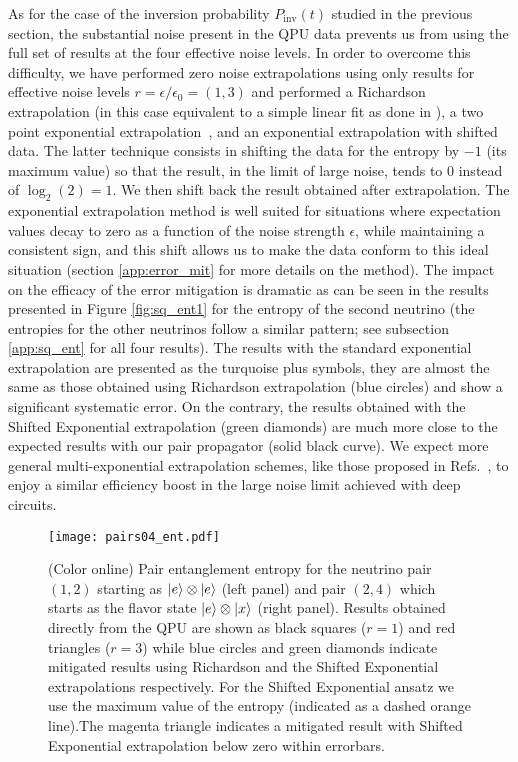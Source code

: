 \documentclass[10pt]{article}
\begin{document}
As for the case of the inversion probability $P_{\text{inv}}(t)$ studied in the previous section, the substantial noise present in the QPU data prevents us from using the full set of results at the four effective noise levels. In order to overcome this difficulty, we have performed zero noise extrapolations using only results for effective noise levels $r=\epsilon/\epsilon_0=(1,3)$ and performed a Richardson extrapolation (in this case equivalent to a simple linear fit as done in \cite{Dumitrescu2018}), a two point exponential extrapolation~\cite{Endo2018}, and an exponential extrapolation with shifted data. The latter technique consists in shifting the data for the entropy by $-1$ (its maximum value) so that the result, in the limit of large noise, tends to 0 instead of $\log_2(2)=1$. We then shift back the result obtained after extrapolation. The exponential extrapolation method is well suited for situations where expectation values decay to zero as a function of the noise strength $\epsilon$, while maintaining a consistent sign, and this shift allows us to make the data conform to this ideal situation (section \ref{app:error_mit} for more details on the method). The impact on the efficacy of the error mitigation is dramatic as can be seen in the results presented in Figure \ref{fig:sq_ent1} for the entropy of the second neutrino (the entropies for the other neutrinos follow a similar pattern; see subsection \ref{app:sq_ent} for all four results). The results with the standard exponential extrapolation are presented as the turquoise plus symbols, they are almost the same as those obtained using Richardson extrapolation (blue circles) and show a significant systematic error. On the contrary, the results obtained with the Shifted Exponential extrapolation (green diamonds) are much more close to the expected results with our pair propagator (solid black curve). We expect more general multi-exponential extrapolation schemes, like those proposed in Refs.~\cite{giurgicatiron2020,cai2020}, to enjoy a similar efficiency boost in the large noise limit achieved with deep circuits.

\begin{figure}
 \centering
 \texttt{[image: pairs04\_ent.pdf]}
 \caption{(Color online) Pair entanglement entropy for the neutrino pair $(1,2)$ starting as $\ket{e}\otimes\ket{e}$ (left panel) and pair $(2,4)$ which starts as the flavor state $\ket{e}\otimes\ket{x}$ (right panel). Results obtained directly from the QPU are shown as black squares ($r=1$) and red triangles ($r=3$) while blue circles and green diamonds indicate mitigated results using Richardson and the Shifted Exponential extrapolations respectively. For the Shifted Exponential ansatz we use the maximum value of the entropy (indicated as a dashed orange line).The magenta triangle indicates a mitigated result with Shifted Exponential extrapolation below zero within errorbars.}
\label{fig:pair_ent_04}
\end{figure}
\end{document}
